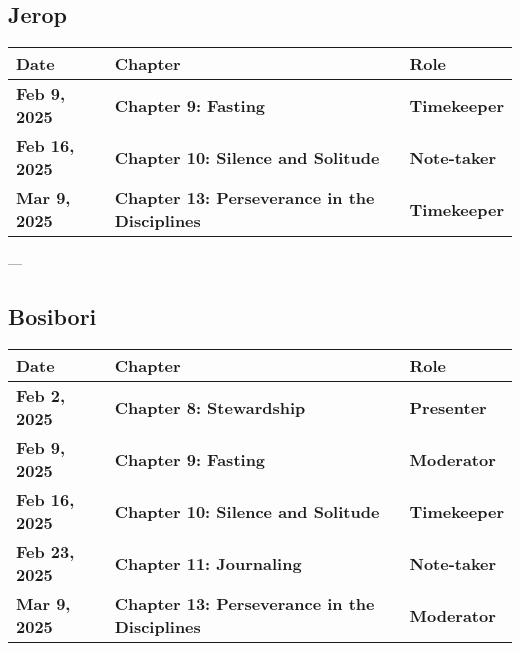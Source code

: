 \documentclass[10pt]{article}
\begin{document}
\subsection*{Jerop}
\begin{tcolorbox}[colframe=blue!40, colback=yellow!10, coltitle=black, sharp corners=south, boxrule=0.4mm, width=\textwidth-2mm]
\renewcommand{\arraystretch}{1.5} %
\begin{longtable}{|@{}p{2.5cm}|@{}p{3.5cm}|@{}p{2.5cm}|}
\hline
\textbf{Date} & \textbf{Chapter} & \textbf{Role} \\
\hline
\endhead
\hline
\endlastfoot
\textbf{Feb 9, 2025} & \textbf{Chapter 9: Fasting} & \textbf{Timekeeper} \\
\hline
\textbf{Feb 16, 2025} & \textbf{Chapter 10: Silence and Solitude} & \textbf{Note-taker} \\
\hline
\textbf{Mar 9, 2025} & \textbf{Chapter 13: Perseverance in the Disciplines} & \textbf{Timekeeper} \\
\hline
\end{longtable}
\end{tcolorbox}

---

\subsection*{Bosibori}
\begin{tcolorbox}[colframe=blue!40, colback=yellow!10, coltitle=black, sharp corners=south, boxrule=0.4mm, width=\textwidth-2mm]
\renewcommand{\arraystretch}{1.5} %
\begin{longtable}{|@{}p{2.5cm}|@{}p{3.5cm}|@{}p{2.5cm}|}
\hline
\textbf{Date} & \textbf{Chapter} & \textbf{Role} \\
\hline
\endhead
\hline
\endlastfoot
\textbf{Feb 2, 2025} & \textbf{Chapter 8: Stewardship} & \textbf{Presenter} \\
\hline
\textbf{Feb 9, 2025} & \textbf{Chapter 9: Fasting} & \textbf{Moderator} \\
\hline
\textbf{Feb 16, 2025} & \textbf{Chapter 10: Silence and Solitude} & \textbf{Timekeeper} \\
\hline
\textbf{Feb 23, 2025} & \textbf{Chapter 11: Journaling} & \textbf{Note-taker} \\
\hline
\textbf{Mar 9, 2025} & \textbf{Chapter 13: Perseverance in the Disciplines} & \textbf{Moderator} \\
\hline
\end{longtable}
\end{tcolorbox}
\end{document}
